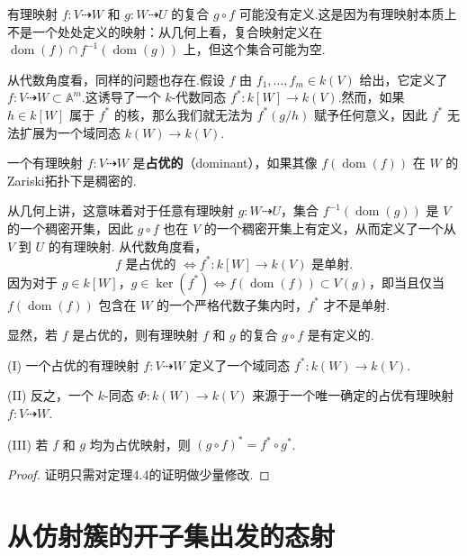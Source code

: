 有理映射 \(f : V \dashrightarrow W\) 和 \(g : W \dashrightarrow U\) 的复合 \(g \circ  f\) 可能没有定义.这是因为有理映射本质上不是一个处处定义的映射：从几何上看，复合映射定义在 \(\operatorname{dom}(f) \cap  f^{-1}(\operatorname{dom}(g))\) 上，但这个集合可能为空.

从代数角度看，同样的问题也存在.假设 \(f\) 由 \({f}_{1},\ldots ,{f}_{m} \in k(V)\) 给出，它定义了 \(f : V \dashrightarrow W \subset  {\mathbb{A}}^{m}\).这诱导了一个 \(k\)-代数同态 \({f}^{ * } : k[W] \rightarrow  k(V)\).然而，如果 \(h \in  k[W]\) 属于 \({f}^{ * }\) 的核，那么我们就无法为 \({f}^{ * }(g/h)\) 赋予任何意义，因此 \({f}^{ * }\) 无法扩展为一个域同态 \(k(W) \rightarrow  k(V)\).

\begin{definition}
一个有理映射 \(f : V \dashrightarrow W\) 是\textbf{占优的}（dominant），如果其像 \(f(\operatorname{dom}(f))\) 在 \(W\) 的Zariski拓扑下是稠密的.
\end{definition}

从几何上讲，这意味着对于任意有理映射 \(g : W \dashrightarrow U\)，集合 \(f^{-1}(\operatorname{dom}(g))\) 是 \(V\) 的一个稠密开集，因此 \(g \circ  f\) 也在 \(V\) 的一个稠密开集上有定义，从而定义了一个从 \(V\) 到 \(U\) 的有理映射.
从代数角度看，
\[
f \text{ 是占优的 } \Leftrightarrow  {f}^{ * } : k[W] \rightarrow  k(V) \text{ 是单射.}
\]
因为对于 \(g \in  k[W]\)，\(g \in  \ker({f}^{ * }) \Leftrightarrow  f(\operatorname{dom}(f)) \subset  V(g)\)，即当且仅当 \(f(\operatorname{dom}(f))\) 包含在 \(W\) 的一个严格代数子集内时，\({f}^{ * }\) 才不是单射.

显然，若 \(f\) 是占优的，则有理映射 \(f\) 和 \(g\) 的复合 \(g \circ  f\) 是有定义的.

\begin{theorem}
(I) 一个占优的有理映射 \(f : V \dashrightarrow W\) 定义了一个域同态 \({f}^{ * } : k(W) \rightarrow  k(V)\).

(II) 反之，一个 \(k\)-同态 \(\Phi  : k(W) \rightarrow  k(V)\) 来源于一个唯一确定的占优有理映射 \(f : V \dashrightarrow W\).

(III) 若 \(f\) 和 \(g\) 均为占优映射，则 \({\left( g \circ  f\right) }^{ * } = {f}^{ * } \circ  {g}^{ * }\).
\end{theorem}
\begin{proof}
证明只需对定理4.4的证明做少量修改.
\end{proof}

\section{从仿射簇的开子集出发的态射}

